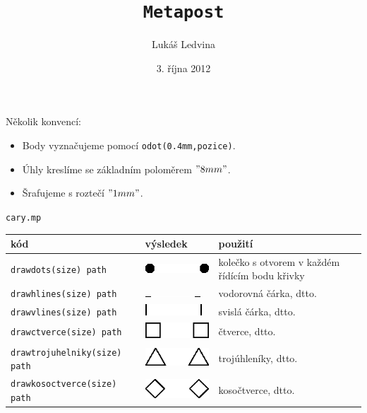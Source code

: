 \documentclass[a4paper,10pt]{article}
\title{\texttt{Metapost}}
\author{Lukáš Ledvina}
\date{3. října 2012}
\begin{document}
\maketitle

\noindent Několik konvencí:
\begin{itemize}
\item Body vyznačujeme pomocí \verb+odot(0.4mm,pozice)+.
\item Úhly kreslíme se základním poloměrem $"8 mm"$.
\item Šrafujeme s roztečí $"1 mm"$.
\end{itemize}

{\centering\large\texttt{cary.mp}\nopagebreak\\\medskip\noindent}
\begin{tabularx}{\textwidth}{|l|l|X|}\hline
    kód & výsledek & použití\\\hline
    \verb+drawdots(size) path+ & \includegraphics{mp_cary_1} & 
	kolečko s otvorem v každém řídícím bodu křivky\\\hline
    \verb+drawhlines(size) path+ & \includegraphics{mp_cary_2}&
	vodorovná čárka, dtto.\\\hline
    \verb+drawvlines(size) path+ & \includegraphics{mp_cary_3}&
	svislá čárka, dtto.\\\hline
    \verb+drawctverce(size) path+ & \includegraphics{mp_cary_4}&
	čtverce, dtto.\\\hline
    \verb+drawtrojuhelniky(size) path+ & \includegraphics{mp_cary_5}&
	trojúhleníky, dtto.\\\hline
    \verb+drawkosoctverce(size) path+ & \includegraphics{mp_cary_6}&
	kosočtverce, dtto.\\\hline
\end{tabularx}\bigskip
\end{document}
